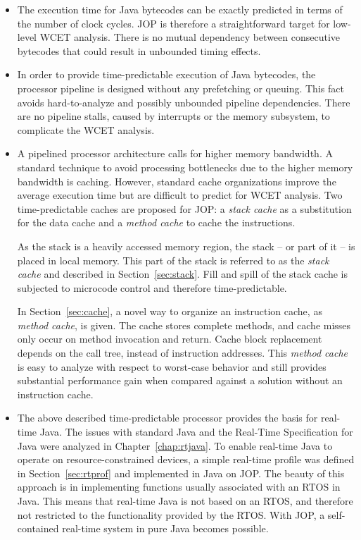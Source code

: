 \begin{itemize}

        \item
The execution time for Java bytecodes can be exactly predicted in
terms of the number of clock cycles.
JOP is therefore a straightforward target for low-level WCET
analysis. There is no mutual dependency between consecutive
bytecodes that could result in unbounded timing effects.

    \item
In order to provide time-predictable execution of Java bytecodes,
the processor pipeline is designed without any prefetching or
queuing. This fact avoids hard-to-analyze and possibly unbounded
pipeline dependencies. There are no pipeline stalls, caused by
interrupts or the memory subsystem, to complicate the WCET analysis.

    \item
A pipelined processor architecture calls for higher memory
bandwidth. A standard technique to avoid processing bottlenecks due
to the higher memory bandwidth is caching.
However, standard cache organizations improve the average execution
time but are difficult to predict for WCET analysis. Two
time-predictable caches are proposed for JOP: a \emph{stack cache}
as a substitution for the data cache and a \emph{method cache} to
cache the instructions.

As the stack is a heavily accessed memory region, the stack -- or
part of it -- is placed in local memory. This part of the stack is
referred to as the \emph{stack cache} and described in
Section~\ref{sec:stack}. Fill and spill of the stack cache is
subjected to microcode control and therefore time-predictable.

In Section~\ref{sec:cache}, a novel way to organize an instruction
cache, as \emph{method cache}, is given. The cache stores complete
methods, and cache misses only occur on method invocation and
return. Cache block replacement depends on the call tree, instead of
instruction addresses. This \emph{method cache} is easy to analyze
with respect to worst-case behavior and still provides substantial
performance gain when compared against a solution without an
instruction cache.

    \item
The above described time-predictable processor provides the basis
for real-time Java. The issues with standard Java and the Real-Time
Specification for Java were analyzed in Chapter~\ref{chap:rtjava}.
To enable real-time Java to operate on resource-constrained devices,
a simple real-time profile was defined in Section~\ref{sec:rtprof}
and implemented in Java on JOP. The beauty of this approach is in
implementing functions usually associated with an RTOS in Java. This
means that real-time Java is not based on an RTOS, and therefore not
restricted to the functionality provided by the RTOS. With JOP, a
self-contained real-time system in pure Java becomes possible.


\end{itemize}
